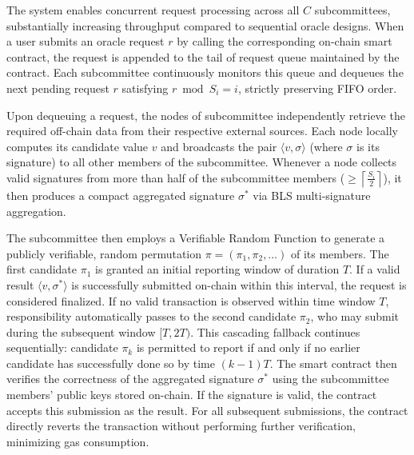\documentclass[journal]{IEEEtran}
\begin{document}
The system enables concurrent request processing across all $C$ subcommittees, substantially increasing throughput compared to sequential oracle designs. When a user submits an oracle request $r$ by calling the corresponding on-chain smart contract, the request is appended to the tail of request queue maintained by the contract. Each subcommittee continuously monitors this queue and dequeues the next pending request $r$ satisfying $r \bmod S_i = i$, strictly preserving FIFO order.

Upon dequeuing a request, the nodes of subcommittee independently retrieve the required off-chain data from their respective external sources. Each node locally computes its candidate value $v$ and broadcasts the pair $\langle v, \sigma\rangle$ (where $\sigma$ is its signature) to all other members of the subcommittee. Whenever a node collects valid signatures from more than half of the subcommittee members ($\ge\left\lceil \frac{S_i}{2} \right\rceil$), it then produces a compact aggregated signature $\sigma^*$ via BLS multi-signature aggregation\cite{BLS2004}.

The subcommittee then employs a Verifiable Random Function\cite{VRF1999Micali} to generate a publicly verifiable, random permutation $\pi = (\pi_1, \pi_2, \dots)$ of its members. The first candidate $\pi_1$ is granted an initial reporting window of duration $T$. If a valid result $\langle v, \sigma^* \rangle$ is successfully submitted on-chain within this interval, the request is considered finalized. If no valid transaction is observed within time window $T$, responsibility automatically passes to the second candidate $\pi_2$, who may submit during the subsequent window $[T, 2T)$. This cascading fallback continues sequentially: candidate $\pi_k$ is permitted to report if and only if no earlier candidate has successfully done so by time $(k-1)T$. The smart contract then verifies the correctness of the aggregated signature $  \sigma^*$ using the subcommittee members' public keys stored on-chain. If the signature is valid, the contract accepts this submission as the result. For all subsequent submissions, the contract directly reverts the transaction without performing further verification, minimizing gas consumption.
\end{document}
